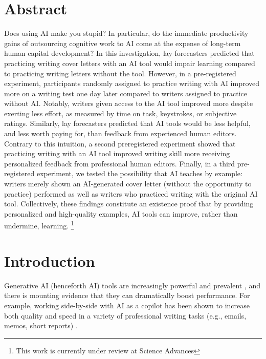 \documentclass[11pt]{report}
\begin{document}
\begin{mainf}
\section{Abstract}
Does using AI make you stupid? In particular, do the immediate productivity gains of outsourcing cognitive work to AI come at the expense of long-term human capital development? In this investigation, lay forecasters predicted that practicing writing cover letters with an AI tool would impair learning compared to practicing writing letters without the tool. However, in a pre-registered experiment, participants randomly assigned to practice writing with AI improved more on a writing test one day later compared to writers assigned to practice without AI. Notably, writers given access to the AI tool improved more despite exerting less effort, as measured by time on task, keystrokes, or subjective ratings. Similarly, lay forecasters predicted that AI tools would be less helpful, and less worth paying for, than feedback from experienced human editors. Contrary to this intuition, a second preregistered experiment showed that practicing writing with an AI tool improved writing skill more receiving personalized feedback from professional human editors. Finally, in a third pre-registered experiment, we tested the possibility that AI teaches by example: writers merely shown an AI-generated cover letter (without the opportunity to practice) performed as well as writers who practiced writing with the original AI tool. Collectively, these findings constitute an existence proof that by providing personalized and high-quality examples, AI tools can improve, rather than undermine, learning. \footnote{This work is currently under review at Science Advances} 

\section{Introduction}

Generative AI (henceforth AI) tools are increasingly powerful and prevalent \cite{bubeck2023}, and there is mounting evidence that they can dramatically boost performance. 
  For example, working side-by-side with AI as a copilot has been shown to increase both quality and speed in a variety of professional writing tasks (e.g., emails, memos, short reports) \cite{noy2023, dellacqua2023, wiles2023algorithmic}.


\end{mainf}
\end{document}
